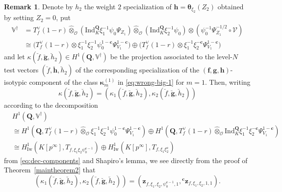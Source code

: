 \documentclass[10pt,letterpaper]{amsart}
\theoremstyle{plain}
\theoremstyle{definition}
\newtheorem{rmk}[thm]{Remark}
\theoremstyle{definition}
\theoremstyle{plain}
\theoremstyle{plain}
\theoremstyle{plain}
\theoremstyle{remark}
\numberwithin{equation}{section}
\newcommand{\cc}{\mathbf{c}}
\def\cO{\mathcal O}
\newcommand{\Q}{\mathbf{Q}}
\newcommand{\bff}{{\boldsymbol{f}}}
\newcommand{\bfg}{{\boldsymbol{g}}}
\newcommand{\bfh}{{\boldsymbol{h}}}
\begin{document}
\begin{rmk}\label{rem:diag-components}
Denote by $h_2$ the weight $2$ specialization of $\bfh=\boldsymbol{\theta}_{\xi_2}(Z_2)$ obtained by setting $Z_2=0$, put
\begin{equation}\label{eq:dec-components}
\begin{aligned}
\mathbb{V}^\dagger&=T_f^\vee(1-r)\hat\otimes_{\cO}({\mathrm{Ind}}_K^\Q\xi_1^{-1}\psi_0\Psi_{Z_1})\hat\otimes_{\cO}({\mathrm{Ind}}_K^\Q\xi_2^{-1}\psi_0)\otimes(\psi_0^{-1}\Psi_{Z_1}^{-1/2}\circ\mathscr{V})\\
&\cong\bigl(T_f^\vee(1-r)\otimes\xi_1^{-1}\xi_2^{-1}\psi_0^{1-\cc}\Psi_{V_1}^{1-\cc}\bigr)\oplus\bigl(T_f^\vee(1-r)\otimes\xi_1^{-1}\xi_2^{-{\cc}}\Psi_{V_1}^{1-\cc}\bigr)
\end{aligned}
\end{equation}
and let $\kappa(\breve{f},\breve{\bfg},\breve{h}_2)\in H^1(\Q,\mathbb{V}^\dagger)$ be the projection associated to the level-$N$ test vectors $(\breve{f},\breve{\bfh},\breve{h}_2)$ of the corresponding specialization of the $(\bff,\bfg,\bfh)$-isotypic component of the class $\boldsymbol{\kappa}_m^{(1)}$ in \eqref{eq:wrong-big-1}  for $m=1$. Then, writing
\begin{equation}\label{eq:comp-base}
\kappa(\breve{f},\breve{\bfg},\breve{h}_2)=(\kappa_1(\breve{f},\breve{\bfg},\breve{h}_2),\kappa_2(\breve{f},\breve{\bfg},\breve{h}_2))
\end{equation}
according to the decomposition
\begin{align*}
&H^1(\Q,\mathbb{V}^\dagger)\\
&\cong H^1(\Q,T_f^\vee(1-r)\hat\otimes_\cO\xi_1^{-1}\xi_2^{-1}\psi_0^{1-\cc}\Psi_{V_1}^{1-\cc})\oplus H^1(\Q,T_f^\vee(1-r)\hat\otimes_{\cO}{\mathrm{Ind}}_K^\Q\xi_1^{-1}\xi_2^{-\cc}\Psi_{V_1}^{1-\cc})\\
&\cong H^1_{\mathrm{Iw}}(K[p^\infty],T_{f,\xi_1\xi_2\psi_0^{\cc-1}})\oplus H^1_{\mathrm{Iw}}(K[p^\infty],T_{f,\xi_1\xi_2^{\cc}})
\end{align*}
from \eqref{eq:dec-components} and Shapiro's lemma, we see directly from the proof of Theorem~\ref{maintheorem2} that
\begin{equation}\label{eq:comp=base}
(\kappa_1(\breve{f},\breve{\bfg},\breve{h}_2),\kappa_2(\breve{f},\breve{\bfg},\breve{h}_2))=(\mathbf{z}_{f,\xi_1,\xi_2,\psi_0^{\cc-1},1},{}^\cc\mathbf{z}_{f,\xi_1,\xi_2,1,1}).
\end{equation}
\end{rmk}
\end{document}
